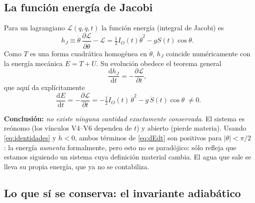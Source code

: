 \documentclass[11pt,a4paper]{article}
\newcommand{\dd}{\mathrm{d}}
\begin{document}
\subsection{La función energía de Jacobi}

Para un lagrangiano $\mathcal L(q,\dot q,t)$ la función energía (integral de Jacobi) es
\begin{equation}
h_J \equiv \dot\theta\,\frac{\partial\mathcal L}{\partial\dot\theta}-\mathcal L
= \tfrac12 I_O(t)\dot\theta^2 - g S(t)\cos\theta .
\end{equation}
Como $T$ es una forma cuadrática homogénea en $\dot\theta$, $h_J$ coincide numéricamente con la
energía mecánica $E=T+U$. Su evolución obedece el teorema general
\begin{equation}
\frac{\dd h_J}{\dd t} = -\frac{\partial\mathcal L}{\partial t},
\end{equation}
que aquí da explícitamente
\begin{equation}
\boxed{\;
\frac{\dd E}{\dd t} = -\frac{\partial\mathcal L}{\partial t}
= -\tfrac12 \dot I_O(t)\,\dot\theta^2 - g\,\dot S(t)\cos\theta \;\neq 0 .}
\label{eq:dEdt}
\end{equation}

\textbf{Conclusión:} \emph{no existe ninguna cantidad exactamente conservada}. El sistema es
reónomo (los vínculos V4--V6 dependen de $t$) y abierto (pierde materia). Usando
\eqref{eq:identidades} y $\dot h<0$, ambos términos de \eqref{eq:dEdt} son positivos para
$|\theta|<\pi/2$: la energía \emph{aumenta} formalmente, pero esto no es paradójico: sólo refleja
que estamos siguiendo un sistema cuya definición material cambia. El agua que sale se lleva su
propia energía, que ya no se contabiliza.

\subsection{Lo que sí se conserva: el invariante adiabático}
\label{sec:adiabatico}
\end{document}
